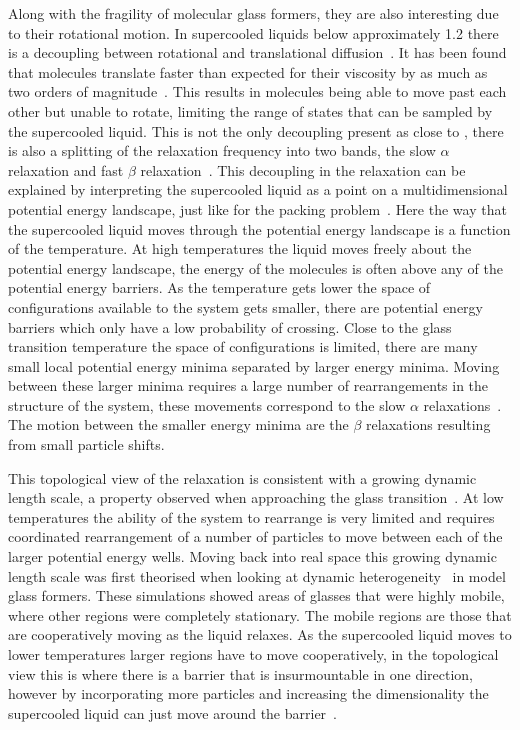 Along with the fragility of molecular glass formers, they are also interesting due to their rotational motion. In supercooled liquids below approximately \SI{1.2}{\Tg} there is a decoupling between rotational and translational diffusion~\tocite. It has been found that molecules translate faster than expected for their viscosity by as much as two orders of magnitude~\cite{debenedetti:01}. This results in molecules being able to move past each other but unable to rotate, limiting the range of states that can be sampled by the supercooled liquid. This is not the only decoupling present as close to \si{\Tg}, there is also a splitting of the relaxation frequency into two bands, the slow $\alpha$ relaxation and fast $\beta$ relaxation~\tocite. This decoupling in the relaxation can be explained by interpreting the supercooled liquid as a point on a multidimensional potential energy landscape, just like for the packing problem~\secref{}. Here the way that the supercooled liquid moves through the potential energy landscape is a function of the temperature. At high temperatures the liquid moves freely about the potential energy landscape, the energy of the molecules is often above any of the potential energy barriers. As the temperature gets lower the space of configurations available to the system gets smaller, there are potential energy barriers which only have a low probability of crossing. Close to the glass transition temperature the space of configurations is limited, there are many small local potential energy minima separated by larger energy minima. Moving between these larger minima requires a large number of rearrangements in the structure of the system, these movements correspond to the slow $\alpha$ relaxations~. The motion between the smaller energy minima are the $\beta$ relaxations resulting from small particle shifts.

\begin{figure}
    \caption{}
    \label{fig:pe landscape}
\end{figure}

This topological view of the relaxation is consistent with a growing dynamic length scale, a property observed when approaching the glass transition~\cite{berthier:05}. At low temperatures the ability of the system to rearrange is very limited and requires coordinated rearrangement of a number of particles to move between each of the larger potential energy wells. Moving back into real space this growing dynamic length scale was first theorised when looking at dynamic heterogeneity~\cite{hurley:95} in model glass formers. These simulations showed areas of glasses that were highly mobile, where other regions were completely stationary. The mobile regions are those that are cooperatively moving as the liquid relaxes. As the supercooled liquid moves to lower temperatures larger regions have to move cooperatively, in the topological view this is where there is a barrier that is insurmountable in one direction, however by incorporating more particles and increasing the dimensionality the supercooled liquid can just move around the barrier~.


